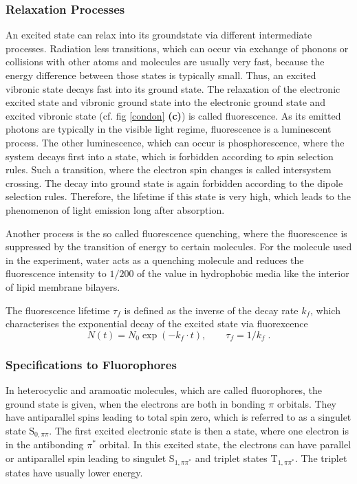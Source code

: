\documentclass[draft]{scrartcl}
\numberwithin{equation}{section}
\numberwithin{figure}{section}
\numberwithin{table}{section}
\newcommand{\eq}[2]{\begin{equation}#1\label{#2}\end{equation}}
\begin{document}
\subsubsection{Relaxation Processes}
An excited state can relax into its groundstate via different intermediate processes. Radiation less transitions, which can occur via exchange of phonons or collisions with other atoms and molecules are usually very fast, because the energy difference between those states is typically small. Thus, an excited vibronic state decays fast into its ground state. The relaxation of the electronic excited state and vibronic ground state into the electronic ground state and excited vibronic state (cf. fig \ref{condon} \textbf{(c)}) is called fluorescence. As its emitted photons are typically in the visible light regime, fluorescence is a luminescent process. The other luminescence, which can occur is phosphorescence, where the system decays first into a state, which is forbidden according to spin selection rules. Such a transition, where the electron spin changes is called intersystem crossing. The decay into ground state is again forbidden according to the dipole selection rules. Therefore, the lifetime if this state is very high, which leads to the phenomenon of light emission long after absorption.

Another process is the so called fluorescence quenching, where the fluorescence is suppressed by the transition of energy to certain molecules. For the molecule used in the experiment, water acts as a quenching molecule and reduces the fluorescence intensity to $1/200$ of the value in hydrophobic media like the interior of lipid membrane bilayers.

The fluorescence lifetime $\tau_f$ is defined as the inverse of the decay rate $k_f$, which characterises the exponential decay of the excited state via fluorexcence
\eq{N(t) =N_0 \exp (-k_f \cdot  t) , \qquad \tau_f=1/k_f \; .}{rate}



\subsubsection{Specifications to Fluorophores}
In heterocyclic and aramoatic molecules, which are called fluorophores, the ground state is given, when the electrons are both in bonding $\pi$ orbitals. They have antiparallel spins leading to total spin zero, which is referred to as a singulet state S$_{0,\pi\pi}$. The first excited electronic state is then a state, where one electron is in the antibonding $\pi^*$ orbital. In this excited state, the electrons can have parallel or antiparallel spin leading to singulet S$_{1, \pi \pi^*}$ and triplet states T$_{1, \pi \pi^*}$. The triplet states have usually lower energy.
\end{document}
